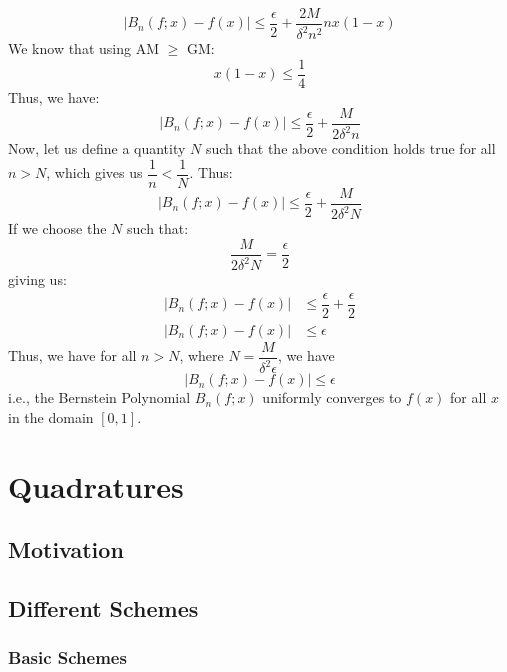 \documentclass[
]{book}
\begin{document}
\begin{equation*}
    |B_n(f;x) - f(x)| \leq \frac{\epsilon}{2} + \dfrac{2M}{\delta^2 n^2} nx(1-x)
\end{equation*}
We know that using AM \(\geq\) GM:
\begin{equation*}
    x(1-x) \leq \dfrac{1}{4}
\end{equation*}
Thus, we have:
\begin{equation*}
    |B_n(f;x) - f(x)| \leq \frac{\epsilon}{2} + \dfrac{M}{2\delta^2 n}
\end{equation*}
Now, let us define a quantity \(N\) such that the above condition holds true for all \(n > N\), which gives us \(\dfrac{1}{n} < \dfrac{1}{N}\). Thus:
\begin{equation*}
    |B_n(f;x) - f(x)| \leq \frac{\epsilon}{2} + \dfrac{M}{2\delta^2 N}
\end{equation*}
If we choose the \(N\) such that:
\begin{equation*}
    \dfrac{M}{2\delta^2N} = \dfrac{\epsilon}{2}
\end{equation*}
giving us:
\begin{align*}
    |B_n(f;x) - f(x)| &\leq \dfrac{\epsilon}{2} + \dfrac{\epsilon}{2} \\
    |B_n(f;x) - f(x)| &\leq \epsilon
\end{align*}
Thus, we have for all \(n > N\), where \(N = \dfrac{M}{\delta^2\epsilon}\), we have
\begin{equation}
    |B_n(f;x) - f(x)| \leq \epsilon
\end{equation}
i.e., the Bernstein Polynomial \(B_n(f;x)\) uniformly converges to \(f(x)\) for all \(x\) in the domain \([0,1]\).

\hypertarget{quadratures}{%
\chapter{Quadratures}\label{quadratures}}

\hypertarget{motivation-2}{%
\section{Motivation}\label{motivation-2}}

\hypertarget{different-schemes}{%
\section{Different Schemes}\label{different-schemes}}

\hypertarget{basic-schemes}{%
\subsection{Basic Schemes}\label{basic-schemes}}
\end{document}
